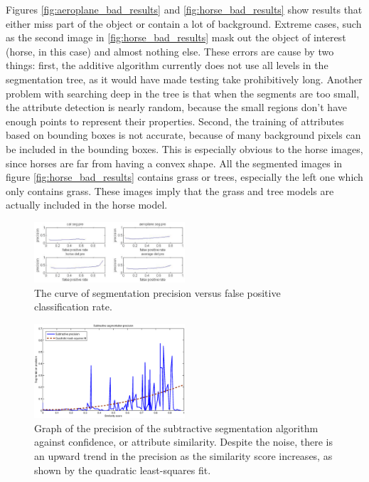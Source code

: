 \documentclass[10pt,twocolumn,letterpaper]{article}
\begin{document}
Figures \ref{fig:aeroplane_bad_results} and \ref{fig:horse_bad_results} show results
that either miss part of the object or contain a lot of background.  Extreme cases,
such as the second image in \ref{fig:horse_bad_results} mask out the object of interest
(horse, in this case) and almost nothing else.  These errors are cause by two things:
first, the additive algorithm currently does not use all levels in the segmentation tree,
as it would have made testing take prohibitively long.
Another problem with searching deep in the tree is that when the segments are too small, 
the attribute detection is nearly random, because the small regions 
don't have enough points to represent their properties. Second, the training of attributes based on
bounding boxes is not accurate, because of many background pixels can be included in the bounding boxes. 
This is especially obvious to the horse images, since horses are far from having a convex shape. 
All the segmented images in figure \ref{fig:horse_bad_results} contains grass or trees, especially the 
left one which only contains grass. These images imply that the grass and tree models are actually
included in the horse model.\\  


\begin{figure}
\centering
\includegraphics[width=0.5\textwidth]{figures/add_res/roc_seg.png.eps}
\caption{The curve of segmentation precision versus false positive classification rate.}
\label{fig:roc_seg}
\end{figure}

\begin{figure}
\centering
\includegraphics[width=0.5\textwidth]{figures/SubSegPrec.eps}
\caption{Graph of the precision of the subtractive segmentation
algorithm against confidence, or attribute similarity.  Despite
the noise, there is an upward trend in the precision
as the similarity score increases, as shown by the 
quadratic least-squares fit.}
\label{fig:sub_seg_prec}
\end{figure}
\end{document}
